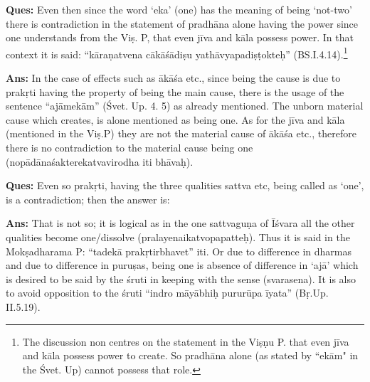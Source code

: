 \textbf{Ques:} Even then since the word ‘eka’ (one) has the meaning of being ‘not-two’ there is contradiction in the statement of pradhāna alone having the power since one understands from the Viṣ. P, that even jīva and kāla possess power. In that context it is said: “kāraṇatvena cākāśādiṣu yathāvyapadiṣṭokteḥ” (BS.I.4.14).\footnote{The discussion non centres on the statement in the Viṣṇu P. that even jīva and kāla possess power to create. So pradhāna alone (as stated by ``ekām" in the Śvet. Up) cannot possess that role.}

\textbf{}



\textbf{Ans:} In the case of effects such as ākāśa etc., since being the cause is due to prakṛti having the property of being the main cause, there is the usage of the sentence “ajāmekām” (Śvet. Up. 4. 5) as already mentioned. The unborn material cause which creates, is alone mentioned as being one. As for the jīva and kāla (mentioned in the Viṣ.P) they are not the material cause of ākāśa etc., therefore there is no contradiction to the material cause being one (nopādānaśakterekatvavirodha iti bhāvaḥ).

\textbf{Ques:} Even so prakṛti, having the three qualities sattva etc, being called as ‘one’, is a contradiction; then the answer is:

\textbf{Ans:} That is not so; it is logical as in the one sattvaguṇa of Īśvara all the other qualities become one/dissolve (pralayenaikatvopapatteḥ). Thus it is said in the Mokṣadharama P: “tadekā prakṛtirbhavet” iti. Or due to difference in dharmas and due to difference in puruṣas, being one is absence of difference in ‘ajā’ which is desired to be said by the śruti in keeping with the sense (svarasena). It is also to avoid opposition to the śruti “indro māyābhiḥ pururūpa īyata” (Bṛ.Up. II.5.19). 

